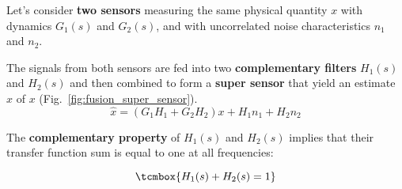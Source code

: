 Let's consider \textbf{two sensors} measuring the same physical quantity \(x\) with
dynamics \(G_1(s)\) and \(G_2(s)\), and with uncorrelated noise characteristics
\(n_1\) and \(n_2\).

\bigskip

The signals from both sensors are fed into two \textbf{complementary filters} \(H_1(s)\)
and \(H_2(s)\) and then combined to form a \textbf{super sensor} that yield an estimate \(\hat{x}\) of \(x\) (Fig.~\ref{fig:fusion_super_sensor}).
\begin{equation*}
  \hat{x} = \left(G_1 H_1 + G_2 H_2\right) x + H_1 n_1 + H_2 n_2
\end{equation*}

\begin{minipage}[t]{0.69\linewidth}
  The \textbf{complementary property} of \(H_1(s)\) and \(H_2(s)\) implies that their transfer function sum is equal to one at all frequencies:
\end{minipage}\hfill
\begin{minipage}[t]{0.29\linewidth}
  \vspace{-2em}
  \begin{equation*}
    \tcmbox{H_1(s) + H_2(s) = 1}
  \end{equation*}
\end{minipage}

